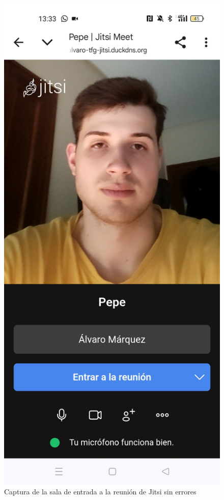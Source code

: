 \begin{figure}[H]
    \centering
    \includegraphics[height=0.6\textheight]{img/entrarreunion.jpg}
    \caption{Captura de la sala de entrada a la reunión de Jitsi sin errores}
    \label{fig: Sala entrada reunion jitsi}
\end{figure}

